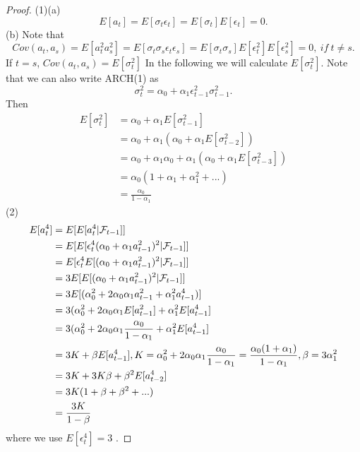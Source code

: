 \begin{proof}
(1)(a) $$E[a_t] = E[\sigma_t\epsilon_t]=E[\sigma_t]E[\epsilon_t] = 0.$$	
(b) 
Note that 
$$Cov(a_t,a_s) = E[a_t^2a_{s}^2] = E[\sigma_t\sigma_{s}\epsilon_t\epsilon_{s}] =E[\sigma_t\sigma_{s}]E[\epsilon_t^2]E[\epsilon_{s}^2] = 0, ~if~ t\neq s.$$
If $t=s$, $Cov(a_t,a_s) = E[\sigma_t^2]$
In the following we will calculate $E[\sigma_t^2]$.
Note that we can also write ARCH(1) as $$\sigma_t^2 = \alpha_0 + \alpha_1\epsilon_{t-1}^2 \sigma_{t-1}^2.$$
Then
\begin{align*}
E[\sigma_t^2] &= \alpha_0 + \alpha_1 E[\sigma_{t-1}^2] \\
&= \alpha_0 + \alpha_1(\alpha_0 + \alpha_1 E[\sigma_{t-2}^2]) \\
&= \alpha_0 + \alpha_1\alpha_0 + \alpha_1(\alpha_0 +  \alpha_1E[\sigma_{t-3}^2]) \\
&= \alpha_0(1 + \alpha_1 + \alpha_1^2 + ...)\\
&= \frac{\alpha_0}{1 - \alpha_1 }
\end{align*}
(2)
\begin{align*}
E[a_t^4] &= E[E[a_t^4|\mathcal{F}_{t-1}]] \\
&=E[E[\epsilon_t^4(\alpha_0 + \alpha_1 a_{t-1}^2)^2|\mathcal{F}_{t-1}]] \\
&=E[\epsilon_t^4E[(\alpha_0 + \alpha_1 a_{t-1}^2)^2|\mathcal{F}_{t-1}]] \\
&=3E[E[(\alpha_0 + \alpha_1 a_{t-1}^2)^2|\mathcal{F}_{t-1}]] \\
&=3E[(\alpha_0^2 + 2\alpha_0\alpha_1 a_{t-1}^2 + \alpha_1^2a_{t-1}^4)] \\
&=3(\alpha_0^2 + 2\alpha_0\alpha_1 E[a_{t-1}^2] + \alpha_1^2E[a_{t-1}^4] \\
&=3(\alpha_0^2 + 2\alpha_0\alpha_1 \frac{\alpha_0}{1 - \alpha_1} + \alpha_1^2E[a_{t-1}^4] \\
&= 3K + \beta E[a_{t-1}^4],K = \alpha_0^2 + 2\alpha_0\alpha_1 \frac{\alpha_0}{1 - \alpha_1} = \frac{\alpha_0(1 + \alpha_1)}{1 - \alpha_1},\beta = 3\alpha_1^2 \\
&= 3K + 3K\beta + \beta^2E[a_{t-2}^4] \\
&= 3K(1 + \beta + \beta^2 + ...) \\
&= \frac{3K}{1-\beta} 
\end{align*}
where we use $E[\epsilon_t^4] = 3$ .
\end{proof}






